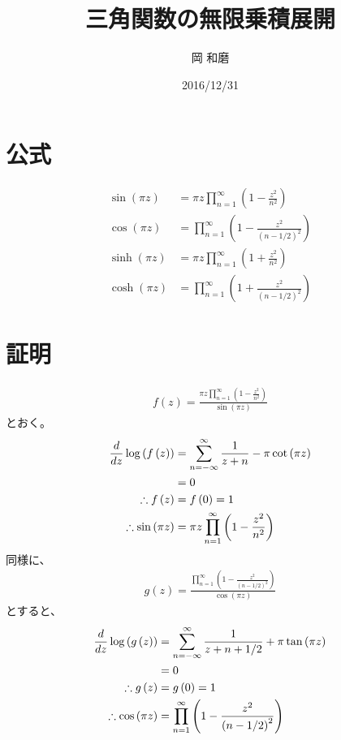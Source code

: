 \documentclass[10pt,onecolumn,dvipdfmx]{jsarticle}
\begin{document}
\title{三角関数の無限乗積展開}
\author{岡 和磨}
\date{2016/12/31}
\maketitle

\section{公式}
\begin{align}
\sin{\left( \pi z\right) } &= \pi z\prod_{n=1} ^{\infty } \left( 1 - \frac{z^2 }{n^2 } \right) \\
\cos{\left( \pi z\right) } &= \prod_{n=1} ^{\infty } \left( 1 - \frac{z^2 }{\left( n - 1/2\right) ^2 } \right) \\
\sinh{\left( \pi z\right) } &= \pi z\prod_{n=1} ^{\infty } \left( 1 + \frac{z^2 }{n^2 } \right) \\
\cosh{\left( \pi z\right) } &= \prod_{n=1} ^{\infty } \left( 1 + \frac{z^2 }{\left( n - 1/2\right) ^2 } \right) 
\end{align}

\section{証明}
\begin{align}
f\left( z\right) = \frac{\pi z\prod_{n=1} ^{\infty } \left( 1 - \frac{z^2 }{n^2 } \right) }{\sin{\left( \pi z\right) } } 
\end{align}
とおく。
\begin{align}
\frac{d}{dz} \log{\left( f\left( z\right) \right) } &= \sum_{n=-\infty } ^{\infty } \frac{1}{z + n} - \pi \cot{\left( \pi z\right) } \notag \\
&= 0\notag \\
\therefore f\left( z\right) &= f\left( 0\right) =1\notag \\
\therefore \sin{\left( \pi z\right) } &= \pi z\prod_{n=1} ^{\infty } \left( 1 - \frac{z^2 }{n^2 } \right) 
\end{align}
同様に、
\begin{align}
g\left( z\right) = \frac{\prod_{n=1} ^{\infty } \left( 1 - \frac{z^2 }{\left( n - 1/2\right) ^2 } \right) }{\cos{\left( \pi z\right) } } 
\end{align}
とすると、
\begin{align}
\frac{d}{dz} \log{\left( g\left( z\right) \right) } &= \sum_{n=-\infty } ^{\infty } \frac{1}{z + n + 1 / 2} + \pi \tan{\left( \pi z\right) } \notag \\
&= 0\notag \\
\therefore g\left( z\right) &= g\left( 0\right) =1\notag \\
\therefore \cos{\left( \pi z\right) } &= \prod_{n=1} ^{\infty } \left( 1 - \frac{z^2 }{\left( n - 1/2\right) ^2 } \right) 
\end{align}
\end{document}
